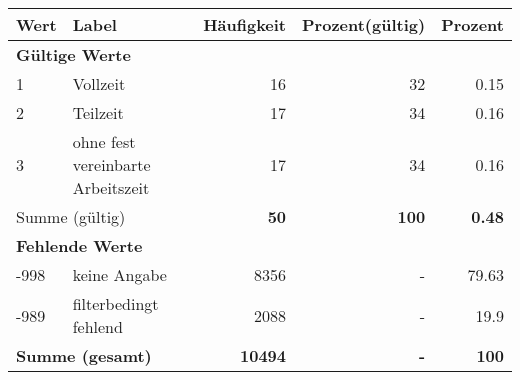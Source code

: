      \begin{longtable}{lXrrr}
     \toprule
     \textbf{Wert} & \textbf{Label} & \textbf{Häufigkeit} & \textbf{Prozent(gültig)} & \textbf{Prozent} \\
     \endhead
     \midrule
     \multicolumn{5}{l}{\textbf{Gültige Werte}}\\

     1 &
     \multicolumn{1}{X}{ Vollzeit   } &


       \num{16} &
       \num[round-mode=places,round-precision=2]{32} &
         \num[round-mode=places,round-precision=2]{0.15} \\

     2 &
     \multicolumn{1}{X}{ Teilzeit   } &


       \num{17} &
       \num[round-mode=places,round-precision=2]{34} &
         \num[round-mode=places,round-precision=2]{0.16} \\

     3 &
     \multicolumn{1}{X}{ ohne fest vereinbarte Arbeitszeit   } &


       \num{17} &
       \num[round-mode=places,round-precision=2]{34} &
         \num[round-mode=places,round-precision=2]{0.16} \\
     \midrule
     \multicolumn{2}{l}{Summe (gültig)} &
       \textbf{\num{50}} &
     \textbf{\num{100}} &
       \textbf{\num[round-mode=places,round-precision=2]{0.48}} \\
     \multicolumn{5}{l}{\textbf{Fehlende Werte}}\\
       -998 &
       keine Angabe &
         \num{8356} &
        - &
         \num[round-mode=places,round-precision=2]{79.63} \\
       -989 &
       filterbedingt fehlend &
         \num{2088} &
        - &
         \num[round-mode=places,round-precision=2]{19.9} \\
     \midrule
     \multicolumn{2}{l}{\textbf{Summe (gesamt)}} &
          \textbf{\num{10494}} &
        \textbf{-} &
        \textbf{\num{100}} \\
     \bottomrule
     \end{longtable}
     
